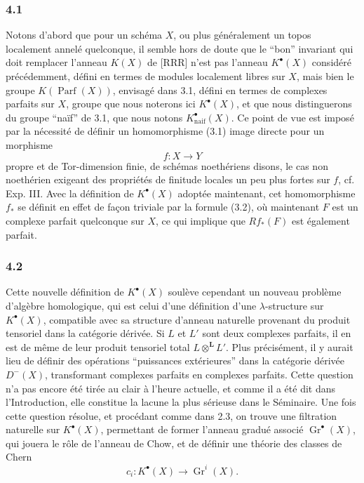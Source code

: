 \documentclass[11pt]{article}
\newcommand{\Gr}{\operatorname{Gr}}
\newcommand{\Parf}{\operatorname{Parf}}
\providecommand{\Gr}{\operatorname{Gr}}
\providecommand{\Gr}{\operatorname{G}}
\begin{document}
\subsubsection*{4.1}
Notons d'abord que pour un sch\'ema $X$, ou plus g\'en\'eralement un topos localement annel\'e quelconque, il semble hors de doute que le ``bon'' invariant qui doit remplacer l'anneau $K(X)$ de [RRR] n'est pas l'anneau $K^\bullet(X)$ consid\'er\'e pr\'ec\'edemment, d\'efini en termes de modules localement libres sur $X$, mais bien le groupe $K(\Parf(X))$, envisag\'e dans 3.1, d\'efini en termes de complexes parfaits sur $X$, groupe que nous noterons ici $K^\bullet(X)$, et que nous distinguerons du groupe ``na\"if'' de 3.1, que nous notons $K^\bullet_{\mathrm{naif}}(X)$. Ce point de vue est impos\'e par la n\'ecessit\'e de d\'efinir un homomorphisme (3.1) image directe pour un morphisme
\[
f:X\longrightarrow Y
\]
propre et de Tor-dimension finie, de sch\'emas noeth\'eriens disons, le cas non noeth\'erien exigeant des propri\'et\'es de finitude locales un peu plus fortes sur $f$, cf. Exp. III. Avec la d\'efinition de $K^\bullet(X)$ adopt\'ee maintenant, cet homomorphisme $f_*$ se d\'efinit en effet de fa\c{c}on triviale par la formule (3.2), o\`u maintenant $F$ est un complexe parfait quelconque sur $X$, ce qui implique que $Rf_*(F)$ est \'egalement parfait.

\subsubsection*{4.2}
Cette nouvelle d\'efinition de $K^\bullet(X)$ soul\`eve cependant un nouveau probl\`eme d'alg\`ebre homologique, qui est celui d'une d\'efinition d'une $\lambda$-structure sur $K^\bullet(X)$, compatible avec sa structure d'anneau naturelle provenant du produit tensoriel dans la cat\'egorie d\'eriv\'ee. Si $L$ et $L'$ sont deux complexes parfaits, il en est de m\^eme de leur produit tensoriel total $L\otimes^{\mathbf L}L'$. Plus pr\'ecis\'ement, il y aurait lieu de d\'efinir des op\'erations ``puissances ext\'erieures'' dans la cat\'egorie d\'eriv\'ee $D^-(X)$, transformant complexes parfaits en complexes parfaits. Cette question n'a pas encore \'et\'e tir\'ee au clair \`a l'heure actuelle, et comme il a \'et\'e dit dans l'Introduction, elle constitue la lacune la plus s\'erieuse dans le S\'eminaire. Une fois cette question r\'esolue, et proc\'edant comme dans 2.3, on trouve une filtration naturelle sur $K^\bullet(X)$, permettant de former l'anneau gradu\'e associ\'e $\Gr^\bullet(X)$, qui jouera le r\^ole de l'anneau de Chow, et de d\'efinir une th\'eorie des classes de Chern
\[
c_i:K^\bullet(X)\longrightarrow \Gr^i(X).
\]
\end{document}
